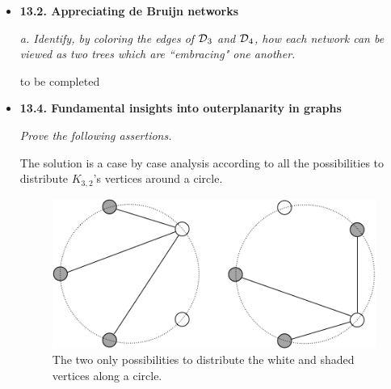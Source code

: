 \begin{itemize}
\item
{\bf 13.2. Appreciating de Bruijn networks}
\smallskip


\noindent
{\em a. Identify, by coloring the edges of $\mbox{$\cal D$}_3$ and $\mbox{$\cal D$}_4$, how each network can be viewed as two trees which are ``embracing" one another.}

\smallskip

to be completed


  \medskip\item 
{\bf 13.4. Fundamental insights into outerplanarity in graphs}
\smallskip

{\em Prove the following assertions.}


\smallskip


The solution is a case by case analysis according to all the possibilities to distribute  $K_{3,2}$'s vertices around a circle.
\begin{figure}[h]
\begin{center}
        \includegraphics[scale=0.4]{FiguresGraph/outerplanarK3,2}
        \caption{The two only possibilities to distribute the white and shaded vertices along a circle.}
\end{center}
\end{figure}


\end{itemize}


